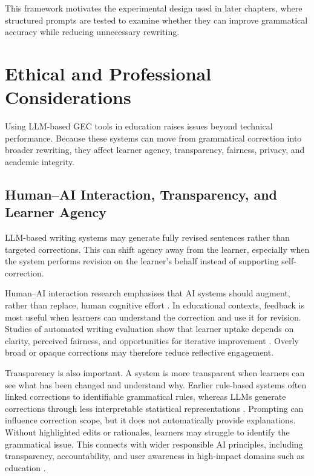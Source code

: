This framework motivates the experimental design used in later chapters, where structured prompts are tested to examine whether they can improve grammatical accuracy while reducing unnecessary rewriting.

\section{Ethical and Professional Considerations}

Using LLM-based GEC tools in education raises issues beyond technical performance. Because these systems can move from grammatical correction into broader rewriting, they affect learner agency, transparency, fairness, privacy, and academic integrity.

\subsection{Human--AI Interaction, Transparency, and Learner Agency}

LLM-based writing systems may generate fully revised sentences rather than targeted corrections. This can shift agency away from the learner, especially when the system performs revision on the learner's behalf instead of supporting self-correction.

Human--AI interaction research emphasises that AI systems should augment, rather than replace, human cognitive effort \cite{amershi2019guidelines}. In educational contexts, feedback is most useful when learners can understand the correction and use it for revision. Studies of automated writing evaluation show that learner uptake depends on clarity, perceived fairness, and opportunities for iterative improvement \cite{ke2019automated}. Overly broad or opaque corrections may therefore reduce reflective engagement.

Transparency is also important. A system is more transparent when learners can see what has been changed and understand why. Earlier rule-based systems often linked corrections to identifiable grammatical rules, whereas LLMs generate corrections through less interpretable statistical representations \cite{NIPS2017_3f5ee243}. Prompting can influence correction scope, but it does not automatically provide explanations. Without highlighted edits or rationales, learners may struggle to identify the grammatical issue. This connects with wider responsible AI principles, including transparency, accountability, and user awareness in high-impact domains such as education \cite{floridi2018ai4people}.

